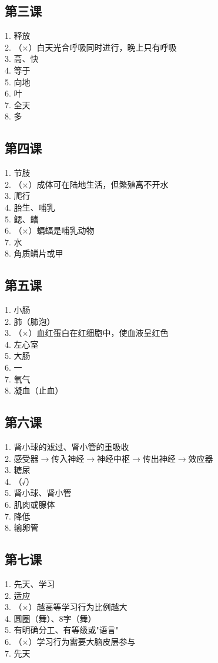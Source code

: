 \documentclass[a4paper,12pt]{ctexart}
\begin{document}
\subsection*{第三课}
1. 释放\\
2. （×）白天光合呼吸同时进行，晚上只有呼吸\\
3. 高、快\\
4. 等于\\
5. 向地\\
6. 叶\\
7. 全天\\
8. 多

\subsection*{第四课}
1. 节肢\\
2. （×）成体可在陆地生活，但繁殖离不开水\\
3. 爬行\\
4. 胎生、哺乳\\
5. 鳃、鳍\\
6. （×）蝙蝠是哺乳动物\\
7. 水\\
8. 角质鳞片或甲

\subsection*{第五课}
1. 小肠\\
2. 肺（肺泡）\\
3. （×）血红蛋白在红细胞中，使血液呈红色\\
4. 左心室\\
5. 大肠\\
6. 一\\
7. 氧气\\
8. 凝血（止血）

\subsection*{第六课}
1. 肾小球的滤过、肾小管的重吸收\\
2. 感受器$\rightarrow$传入神经$\rightarrow$神经中枢$\rightarrow$传出神经$\rightarrow$效应器\\
3. 糖尿\\
4. （√）\\
5. 肾小球、肾小管\\
6. 肌肉或腺体\\
7. 降低\\
8. 输卵管

\subsection*{第七课}
1. 先天、学习\\
2. 适应\\
3. （×）越高等学习行为比例越大\\
4. 圆圈（舞）、8字（舞）\\
5. 有明确分工、有等级或"语言"\\
6. （×）学习行为需要大脑皮层参与\\
7. 先天
\end{document}
